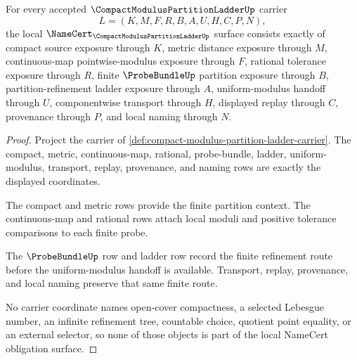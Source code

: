 \begin{theorem}
\label{thm:compact-modulus-partition-ladder-namecert-obligations}
For every accepted $\CompactModulusPartitionLadderUp$ carrier
$$
L=(K,M,F,R,B,A,U,H,C,P,N),
$$
the local $\NameCert_{\CompactModulusPartitionLadderUp}$ surface consists exactly of compact source exposure through $K$, metric distance exposure through $M$, continuous-map pointwise-modulus exposure through $F$, rational tolerance exposure through $R$, finite $\ProbeBundleUp$ partition exposure through $B$, partition-refinement ladder exposure through $A$, uniform-modulus handoff through $U$, componentwise transport through $H$, displayed replay through $C$, provenance through $P$, and local naming through $N$.
\end{theorem}
\begin{proof}
Project the carrier of \autoref{def:compact-modulus-partition-ladder-carrier}. The compact, metric, continuous-map, rational, probe-bundle, ladder, uniform-modulus, transport, replay, provenance, and naming rows are exactly the displayed coordinates.

The compact and metric rows provide the finite partition context. The continuous-map and rational rows attach local moduli and positive tolerance comparisons to each finite probe.

The $\ProbeBundleUp$ row and ladder row record the finite refinement route before the uniform-modulus handoff is available. Transport, replay, provenance, and local naming preserve that same finite route.

No carrier coordinate names open-cover compactness, a selected Lebesgue number, an infinite refinement tree, countable choice, quotient point equality, or an external selector, so none of those objects is part of the local NameCert obligation surface.
\end{proof}

